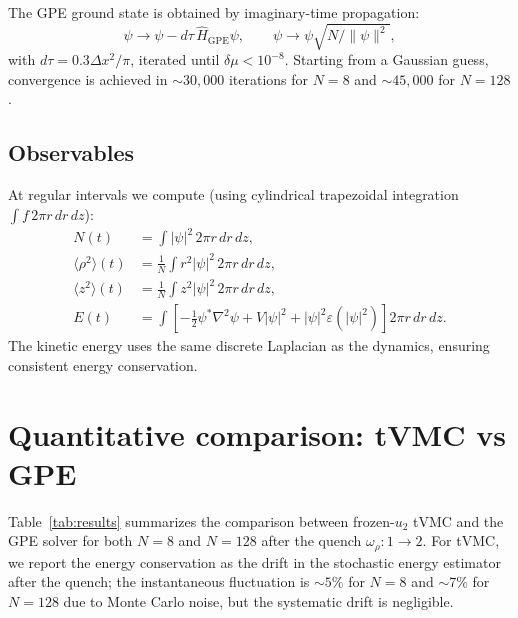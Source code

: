 \documentclass[aps,prl,onecolumn,superscriptaddress,longbibliography,nofootinbib]{revtex4-2}
\newcommand{\avg}[1]{\langle #1 \rangle}
\begin{document}
The GPE ground state is obtained by imaginary-time propagation:
\begin{equation}
\psi \to \psi - d\tau\,\hat{H}_{\mathrm{GPE}}\psi,\qquad
\psi \to \psi\sqrt{N/\|\psi\|^2},
\end{equation}
with $d\tau = 0.3\Delta x^2/\pi$, iterated until $\delta\mu<10^{-8}$.
Starting from a Gaussian guess, convergence is achieved in
$\sim 30{,}000$ iterations for $N=8$ and $\sim 45{,}000$ for $N=128$.

\subsection{Observables}

At regular intervals we compute (using cylindrical trapezoidal
integration $\int f\,2\pi r\,dr\,dz$):
\begin{align}
N(t) &= \int|\psi|^2\,2\pi r\,dr\,dz,\\
\avg{\rho^2}(t) &= \frac{1}{N}\int r^2|\psi|^2\,2\pi r\,dr\,dz,\\
\avg{z^2}(t) &= \frac{1}{N}\int z^2|\psi|^2\,2\pi r\,dr\,dz,\\
E(t) &= \int\!\left[-\frac{1}{2}\psi^*\nabla^2\psi
+ V|\psi|^2 + |\psi|^2\varepsilon(|\psi|^2)\right]
2\pi r\,dr\,dz.
\end{align}
The kinetic energy uses the same discrete Laplacian as the dynamics,
ensuring consistent energy conservation.

\section{Quantitative comparison: tVMC vs GPE}
\label{sec:tvmc_vs_gpe}

Table~\ref{tab:results} summarizes the comparison between frozen-$u_2$
tVMC and the GPE solver for both $N=8$ and $N=128$ after the quench
$\omega_\rho:1\to 2$.  For tVMC, we report the energy conservation as
the drift in the stochastic energy estimator after the quench; the
instantaneous fluctuation is $\sim 5\%$ for $N=8$ and $\sim 7\%$ for
$N=128$ due to Monte Carlo noise, but the systematic drift is
negligible.
\end{document}

